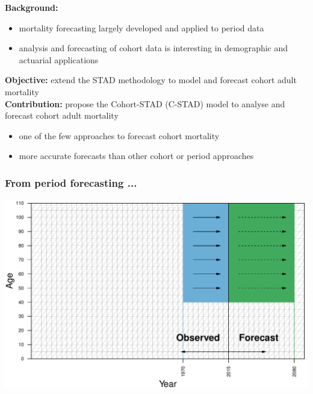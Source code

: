 \documentclass[12pt, xcolor=table]{beamer}  %
\begin{document}
\begin{frame} %
	\textbf{Background:}
	\begin{itemize}
		\setlength\itemsep{0.5em}
		\item mortality forecasting largely developed and applied to period data  
		\item analysis and forecasting of cohort data is interesting in demographic and actuarial applications
	\end{itemize}
	\bigskip \pause
	\textbf{Objective:} extend the STAD methodology to model and forecast cohort adult mortality
	\\ \bigskip \pause
	\textbf{Contribution:} propose the Cohort-STAD (C-STAD) model to analyse and forecast cohort adult mortality
	\begin{itemize}
		\setlength\itemsep{0.5em}
		\item one of the few approaches to forecast cohort mortality 
		\item more accurate forecasts than other cohort or period approaches
	\end{itemize}
	
\end{frame}


\begin{frame}\frametitle{From period forecasting ...}
	
	\vspace{0.4cm}
	\begin{center}
		\includegraphics[scale=0.56]{Figures/Ch4/F1_PERIOD}
	\end{center}
	
\end{frame}
\end{document}
